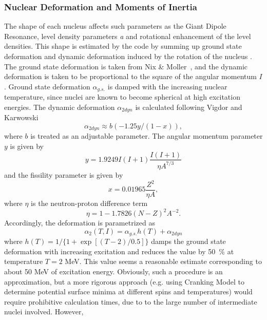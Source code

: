 \documentclass[twocolumn,amsmath,amssymb,10pt,groupedaddress,letter]{revtex4}
\begin{document}
\subsubsection{Nuclear Deformation and Moments of Inertia\label{sec: defor}}
The shape of each nucleus affects such parameters as the Giant Dipole
Resonance, level density parameters \emph{a} and rotational enhancement
of the level densities. This shape is estimated
by the code by summing up ground state deformation and dynamic deformation
induced by the rotation of the nucleus . The ground state deformation
is taken from Nix \& Moller~\cite{masses},
and the dynamic deformation is taken to be proportional to the square
of the angular momentum $I$. Ground state deformation $\alpha_{g.s.}$
is damped with the increasing nuclear temperature, since nuclei are
known to become spherical at high excitation energies. The dynamic
deformation $\alpha_{2dyn}$ is calculated following Vigdor and Karwowski
\cite{VK}
\begin{equation}
\alpha_{2dyn}\approx b(-1.25y/(1-x)),
\label{defor}
\end{equation}
\noindent where $b$ is treated as an adjustable parameter. The angular momentum
parameter $y$ is given by
\begin{equation}
y=1.9249I(I+1)\frac{I(I+1)}{\eta A^{7/3}}
\end{equation}
and the fissility parameter is given by
\begin{equation}
x=0.01965\frac{Z^{2}}{\eta A},
\end{equation}
\noindent where $\eta$ is the neutron-proton difference term
 \begin{equation}
\eta=1-1.7826(N-Z)^{2}A^{-2}.
\end{equation}
 Accordingly, the deformation is parametrized as
\begin{equation}
\alpha_{2}(T,I)=\alpha_{g.s.}h(T)+\alpha_{2dyn}
\label{totdefor}
\end{equation}
\noindent where $h(T)=1/\{1+\exp[(T-2)/0.5]\}$ damps the ground state
deformation with increasing excitation and reduces the value by 50~\%
at temperature $T=2$ MeV. This value seems a reasonable estimate
corresponding to about 50 MeV of excitation energy. Obviously, such
a procedure is an approximation, but a more rigorous approach (e.g.
using Cranking Model to determine potential surface minima at different
spins and temperatures) would require prohibitive calculation times,
due to to the large number of intermediate nuclei involved. However,
\end{document}
